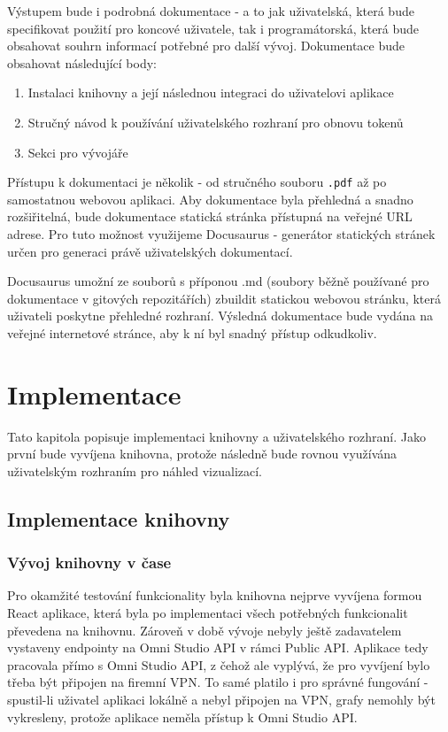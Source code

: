 \documentclass[czech, bc, kiv, he, iso690numb]{fasthesis}
\begin{document}
Výstupem bude i podrobná dokumentace - a to jak uživatelská, která bude specifikovat použití pro koncové uživatele, tak i programátorská, která bude obsahovat souhrn informací potřebné
pro další vývoj. Dokumentace bude obsahovat následující body:

\begin{enumerate}
	\item Instalaci knihovny a její následnou integraci do uživatelovi aplikace
	\item Stručný návod k používání uživatelského rozhraní pro obnovu tokenů
	\item Sekci pro vývojáře
\end{enumerate}

Přístupu k dokumentaci je několik - od stručného souboru \texttt{.pdf} až po samostatnou webovou aplikaci. Aby dokumentace byla přehledná a snadno rozšiřitelná, bude dokumentace statická stránka
přístupná na veřejné URL adrese. Pro tuto možnost využijeme Docusaurus - generátor statických stránek určen pro generaci právě uživatelských dokumentací. 

Docusaurus umožní ze souborů s příponou .md (soubory běžně používané pro dokumentace v gitových repozitářích) zbuildit statickou webovou stránku, která uživateli poskytne přehledné 
rozhraní. Výsledná dokumentace bude vydána na veřejné internetové stránce, aby k ní byl snadný přístup odkudkoliv.


\chapter{Implementace}
Tato kapitola popisuje implementaci knihovny a uživatelského rozhraní. Jako první bude vyvíjena knihovna, protože následně bude rovnou využívána uživatelským rozhraním pro
náhled vizualizací.

\section{Implementace knihovny}

\subsection{Vývoj knihovny v čase}

Pro okamžité testování funkcionality byla knihovna nejprve vyvíjena formou React aplikace, která byla po implementaci všech potřebných funkcionalit převedena na knihovnu.
Zároveň v době vývoje nebyly ještě zadavatelem vystaveny endpointy na Omni Studio API v rámci Public API. Aplikace tedy pracovala přímo s Omni Studio API, z čehož ale vyplývá,
že pro vyvíjení bylo třeba být připojen na firemní VPN. To samé platilo i pro správné fungování - spustil-li uživatel aplikaci lokálně a nebyl připojen na VPN, grafy nemohly být vykresleny,
protože aplikace neměla přístup k Omni Studio API. 
\end{document}
